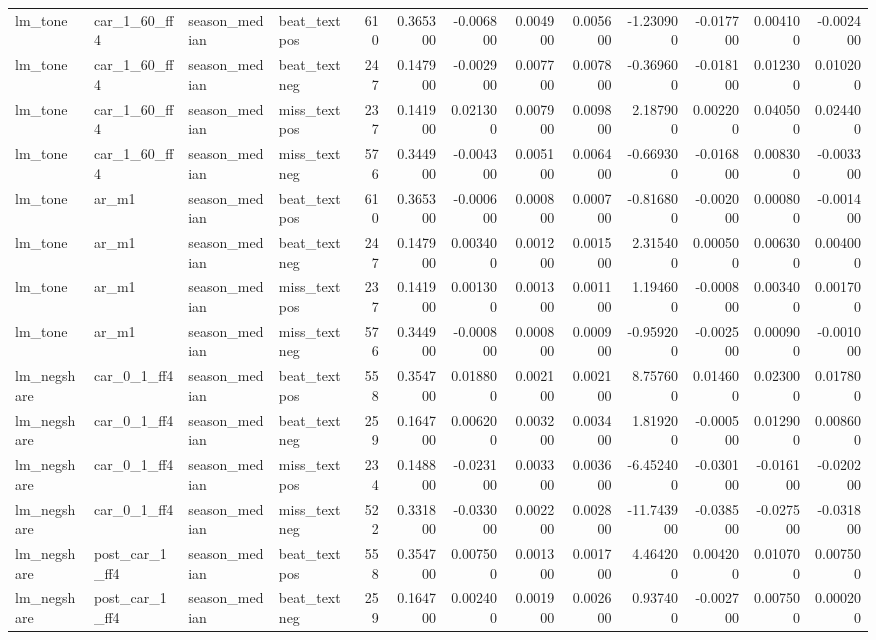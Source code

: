 \begin{table}
\begin{tabular}{llllrrrrrrrrr}
lm\_tone & car\_1\_60\_ff4 & season\_median & beat\_textpos & 610 & 0.365300 & -0.006800 & 0.004900 & 0.005600 & -1.230900 & -0.017700 & 0.004100 & -0.002400 \\
lm\_tone & car\_1\_60\_ff4 & season\_median & beat\_textneg & 247 & 0.147900 & -0.002900 & 0.007700 & 0.007800 & -0.369600 & -0.018100 & 0.012300 & 0.010200 \\
lm\_tone & car\_1\_60\_ff4 & season\_median & miss\_textpos & 237 & 0.141900 & 0.021300 & 0.007900 & 0.009800 & 2.187900 & 0.002200 & 0.040500 & 0.024400 \\
lm\_tone & car\_1\_60\_ff4 & season\_median & miss\_textneg & 576 & 0.344900 & -0.004300 & 0.005100 & 0.006400 & -0.669300 & -0.016800 & 0.008300 & -0.003300 \\
lm\_tone & ar\_m1 & season\_median & beat\_textpos & 610 & 0.365300 & -0.000600 & 0.000800 & 0.000700 & -0.816800 & -0.002000 & 0.000800 & -0.001400 \\
lm\_tone & ar\_m1 & season\_median & beat\_textneg & 247 & 0.147900 & 0.003400 & 0.001200 & 0.001500 & 2.315400 & 0.000500 & 0.006300 & 0.004000 \\
lm\_tone & ar\_m1 & season\_median & miss\_textpos & 237 & 0.141900 & 0.001300 & 0.001300 & 0.001100 & 1.194600 & -0.000800 & 0.003400 & 0.001700 \\
lm\_tone & ar\_m1 & season\_median & miss\_textneg & 576 & 0.344900 & -0.000800 & 0.000800 & 0.000900 & -0.959200 & -0.002500 & 0.000900 & -0.001000 \\
lm\_negshare & car\_0\_1\_ff4 & season\_median & beat\_textpos & 558 & 0.354700 & 0.018800 & 0.002100 & 0.002100 & 8.757600 & 0.014600 & 0.023000 & 0.017800 \\
lm\_negshare & car\_0\_1\_ff4 & season\_median & beat\_textneg & 259 & 0.164700 & 0.006200 & 0.003200 & 0.003400 & 1.819200 & -0.000500 & 0.012900 & 0.008600 \\
lm\_negshare & car\_0\_1\_ff4 & season\_median & miss\_textpos & 234 & 0.148800 & -0.023100 & 0.003300 & 0.003600 & -6.452400 & -0.030100 & -0.016100 & -0.020200 \\
lm\_negshare & car\_0\_1\_ff4 & season\_median & miss\_textneg & 522 & 0.331800 & -0.033000 & 0.002200 & 0.002800 & -11.743900 & -0.038500 & -0.027500 & -0.031800 \\
lm\_negshare & post\_car\_1\_ff4 & season\_median & beat\_textpos & 558 & 0.354700 & 0.007500 & 0.001300 & 0.001700 & 4.464200 & 0.004200 & 0.010700 & 0.007500 \\
lm\_negshare & post\_car\_1\_ff4 & season\_median & beat\_textneg & 259 & 0.164700 & 0.002400 & 0.001900 & 0.002600 & 0.937400 & -0.002700 & 0.007500 & 0.000200 \\

\end{tabular}
\end{table}
